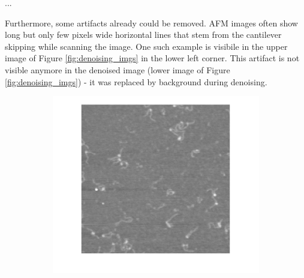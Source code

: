 \documentclass{article}
\begin{document}
...

Furthermore, some artifacts already could be removed. AFM images often show long but only few pixels wide horizontal lines that stem from the cantilever skipping while scanning the image. One such example is visibile in the upper image of Figure \ref{fig:denoising_imgs} in the lower left corner. This artifact is not visible anymore in the denoised image (lower image of Figure \ref{fig:denoising_imgs}) - it was replaced by background during denoising.

\begin{figure}[htb!]
	\centering
	\begin{subfigure}{0.28\textwidth}
		\includegraphics[width=\linewidth]{beforeDenoise_img.png}			
		
		\vspace{0.1cm}
		

\end{subfigure}
\end{figure}
\end{document}
